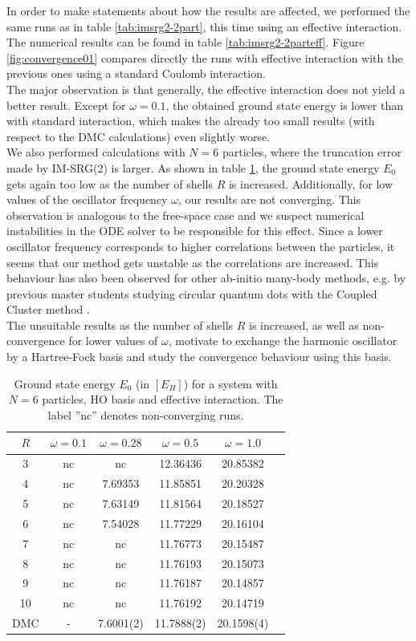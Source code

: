 In order to make statements about how the results are affected, we performed the same runs as in table \ref{tab:imsrg2-2part}, this time using an effective interaction. The numerical results can be found in table \ref{tab:imsrg2-2parteff}. Figure \ref{fig:convergence01} compares directly the runs with effective interaction with the previous ones using a standard Coulomb interaction.\\
The major observation is that generally, the effective interaction does not yield a better result. Except for $\omega=0.1$, the obtained ground state energy is lower than with standard interaction, which makes the already too small results (with respect to the DMC calculations) even slightly worse.\\
We also performed calculations with $N=6$ particles, where the truncation error made by IM-SRG(2) is larger. As shown in table \ref{tab:imsrg2-6parteff}, the ground state energy $E_0$ gets again too low as the number of shells $R$ is increased. Additionally, for low values of the oscillator frequency $\omega$, our results are not converging. This observation is analogous to the free-space case and we suspect numerical instabilities in the ODE solver to be responsible for this effect. Since a lower oscillator frequency corresponds to higher correlations between the particles, it seems that our method gets unstable as the correlations are increased. This behaviour has also been observed for other ab-initio many-body methods, e.g. by previous master students studying circular quantum dots with the Coupled Cluster method \cite{Christoffer,Lohne}.\\
The unsuitable results as the number of shells $R$ is increased, as well as non-convergence for lower values of $\omega$, motivate to exchange the harmonic oscillator by a Hartree-Fock basis and study the convergence behaviour using this basis.


\begin{table}
\begin{center}
\begin{tabular}{cccccc}
\hline\hline
$R$  & $\omega = 0.1$ & $\omega = 0.28$ & $\omega=0.5$ & $\omega=1.0$ \\
\hline
3 & nc&nc &12.36436 & 20.85382 \\
4 & nc&7.69353 &11.85851&20.20328 \\
5 & nc&7.63149 &11.81564&20.18527 \\
6 &nc &7.54028 &11.77229 & 20.16104 \\
7 &nc & nc & 11.76773 & 20.15487 \\
8 &nc & nc & 11.76193 & 20.15073  \\
9 &nc  & nc  & 11.76187 & 20.14857 \\
10 &nc & nc&11.76192 & 20.14719 \\
\hline
DMC& - & 7.6001(2)&11.7888(2) &20.1598(4) \\ %
\hline\hline
\end{tabular}
\end{center}
\caption{Ground state energy $E_0$ (in $\left[E_H\right]$) for a system with $N=6$ particles, HO basis and effective interaction. The label ''nc'' denotes non-converging runs.}
\label{tab:imsrg2-6parteff}
\end{table}

